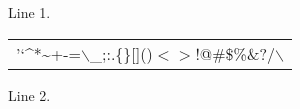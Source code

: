 
Line 1.

\begin{center}\begin{tabular}{l}
'`\^{}*\~{}+-=$\backslash$_;:.\{\}[]()$<$$>$!@\#\$\%\&?/$\backslash$ \\
\end{tabular}\end{center}

Line 2.

